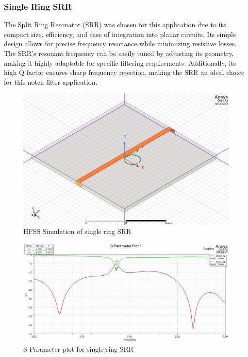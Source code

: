 \documentclass[conference]{IEEEtran}
\begin{document}
\subsubsection{Single Ring SRR}
The Split Ring Resonator (SRR) was chosen for this application due to its compact size, efficiency, and ease of integration into planar circuits. Its simple design allows for precise frequency resonance while minimizing resistive losses. The SRR's resonant frequency can be easily tuned by adjusting its geometry, making it highly adaptable for specific filtering requirements. Additionally, its high Q factor ensures sharp frequency rejection, making the SRR an ideal choice for this notch filter application.

\begin{figure}[h]
    \centering
    \includegraphics[width=1\linewidth]{Images/single_ring_srr_transmission_line.png}
    \caption{HFSS Simulation of single ring SRR}
\end{figure}

\begin{figure}[h]
    \centering
    \includegraphics[width=1\linewidth]{Images/WhatsApp Image 2025-05-05 at 19.06.00_49c8992b.jpg}
    \caption{S-Parameter plot for single ring SRR}
\end{figure}
\end{document}
